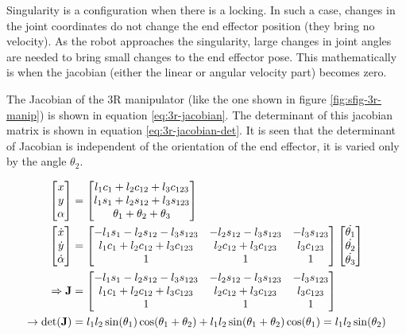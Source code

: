 Singularity is a configuration when there is a locking. In such a case, changes in the joint coordinates do not change the end effector position (they bring no velocity). As the robot approaches the singularity, large changes in joint angles are needed to bring small changes to the end effector pose. This mathematically is when the jacobian (either the linear or angular velocity part) becomes zero.

The Jacobian of the 3R manipulator (like the one shown in figure \ref{fig:sfig-3r-manip}) is shown in equation \ref{eq:3r-jacobian}. The determinant of this jacobian matrix is shown in equation \ref{eq:3r-jacobian-det}. It is seen that the determinant of Jacobian is independent of the orientation of the end effector, it is varied only by the angle $\theta_2$.

\begin{align}
    \begin{bmatrix}
        x \\ y \\ \alpha
        \end{bmatrix} &= \begin{bmatrix}
        l_1 c_1 + l_2 c_{12} + l_3 c_{123} \\
        l_1 s_1 + l_2 s_{12} + l_3 s_{123} \\
        \theta_1 + \theta_2 + \theta_3
        \end{bmatrix}
    \nonumber \\
    \begin{bmatrix}
        \dot{x} \\ \dot{y} \\ \dot{\alpha}
        \end{bmatrix} &= \begin{bmatrix}
        -l_1 s_1-l_2 s_{12}-l_3 s_{123} & -l_2 s_{12}-l_3 s_{123} & -l_3 s_{123} \\
        l_1 c_1+l_2 c_{12}+l_3 c_{123} & l_2 c_{12}+l_3 c_{123} & l_3 c_{123} \\
        1 & 1 & 1
        \end{bmatrix} \begin{bmatrix}
        \dot{\theta_1} \\ \dot{\theta_2} \\ \dot{\theta_3}
        \end{bmatrix} 
    \nonumber \\
    \Rightarrow \mathbf{J} &= \begin{bmatrix}
        -l_1 s_1-l_2 s_{12}-l_3 s_{123} & -l_2 s_{12}-l_3 s_{123} & -l_3 s_{123} \\
        l_1 c_1+l_2 c_{12}+l_3 c_{123} & l_2 c_{12}+l_3 c_{123} & l_3 c_{123} \\
        1 & 1 & 1
        \end{bmatrix}
    \label{eq:3r-jacobian} \\
    \rightarrow \textup{det}(\mathbf{J}) &= l_1 l_2 \sin(\theta_1) \cos(\theta_1 + \theta_2) + l_1 l_2 \sin(\theta_1 + \theta_2) \cos(\theta_1) = l_1 l_2 \sin(\theta_2)
    \label{eq:3r-jacobian-det}
\end{align}

